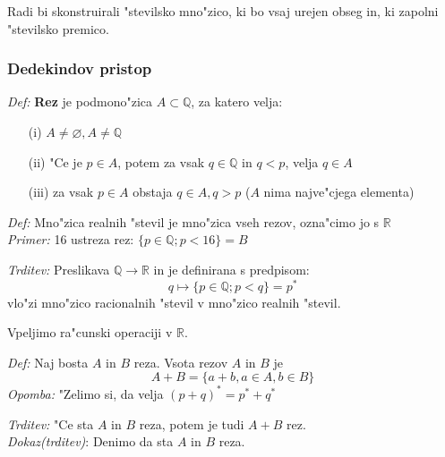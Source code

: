 Radi bi skonstruirali "stevilsko mno"zico, ki bo vsaj urejen obseg in, ki zapolni "stevilsko premico.

\subsubsection*{Dedekindov pristop}
\emph{Def:} \textbf{Rez} je podmono"zica \(A \subset \mathbb{Q}\), za katero velja:
\begin{enumerate}
	\item[(i)] \(A \neq \varnothing, A \neq \mathbb{Q}\)
	\item[(ii)] "Ce je \(p \in A\), potem za vsak \(q \in \mathbb{Q}\) in \(q < p\), velja \(q \in A\)
	\item[(iii)] za vsak \(p \in A\) obstaja \(q \in A, q > p\) (\(A\) nima najve"cjega elementa)
\end{enumerate}

\emph{Def:} Mno"zica realnih "stevil je mno"zica vseh rezov, ozna"cimo jo s \(\mathbb{R}\)\\
\emph{Primer:} 16 ustreza rez: \(\{p \in \mathbb{Q}; p < 16\} = B\)

\emph{Trditev:} Preslikava \(\mathbb{Q} \rightarrow \mathbb{R}\) in je definirana s predpisom:
\[q \mapsto \{p \in \mathbb{Q}; p < q\} = p^*\]
\hspace*{48pt}vlo"zi mno"zico racionalnih "stevil v mno"zico realnih "stevil.

Vpeljimo ra"cunski operaciji v \(\mathbb{R}\).

\emph{Def:} Naj bosta \(A\) in \(B\) reza. Vsota rezov \(A\) in \(B\) je
\[A + B = \{a + b, a \in A, b \in B\}\]
\hspace*{24pt}\emph{Opomba:} "Zelimo si, da velja \((p + q)^* = p^* + q^*\)

\emph{Trditev:} "Ce sta \(A\) in \(B\) reza, potem je tudi \(A + B\) rez.\\
\emph{Dokaz(trditev)}: Denimo da sta \(A\) in \(B\) reza.

